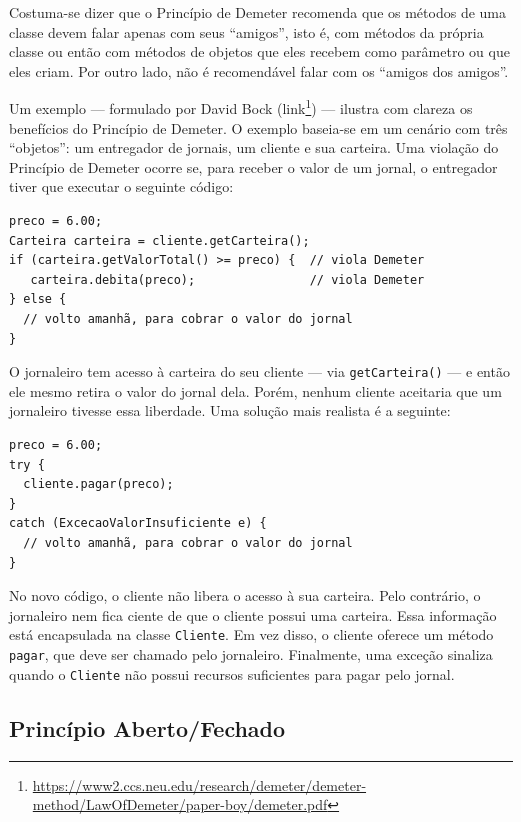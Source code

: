 \documentclass[
  11pt,
  twoside]{book}
\newcommand{\passthrough}[1]{#1}
\DeclareRobustCommand{\href}[2]{#2\footnote{\url{#1}}}
\begin{document}
Costuma-se dizer que o Princípio de Demeter recomenda que os métodos de
uma classe devem falar apenas com seus ``amigos'', isto é, com métodos
da própria classe ou então com métodos de objetos que eles recebem como
parâmetro ou que eles criam. Por outro lado, não é recomendável falar
com os ``amigos dos amigos''.

Um exemplo --- formulado por David Bock
(\href{https://www2.ccs.neu.edu/research/demeter/demeter-method/LawOfDemeter/paper-boy/demeter.pdf}{link})
--- ilustra com clareza os benefícios do Princípio de Demeter. O exemplo
baseia-se em um cenário com três ``objetos'': um entregador de jornais,
um cliente e sua carteira. Uma violação do Princípio de Demeter ocorre
se, para receber o valor de um jornal, o entregador tiver que executar o
seguinte código:

\begin{lstlisting}
preco = 6.00;
Carteira carteira = cliente.getCarteira();
if (carteira.getValorTotal() >= preco) {  // viola Demeter
   carteira.debita(preco);                // viola Demeter
} else {
  // volto amanhã, para cobrar o valor do jornal
}
\end{lstlisting}

O jornaleiro tem acesso à carteira do seu cliente --- via
\passthrough{\lstinline!getCarteira()!} --- e então ele mesmo retira o
valor do jornal dela. Porém, nenhum cliente aceitaria que um jornaleiro
tivesse essa liberdade. Uma solução mais realista é a seguinte:

\begin{lstlisting}
preco = 6.00;
try {
  cliente.pagar(preco);
}
catch (ExcecaoValorInsuficiente e) {
  // volto amanhã, para cobrar o valor do jornal
}
\end{lstlisting}

No novo código, o cliente não libera o acesso à sua carteira. Pelo
contrário, o jornaleiro nem fica ciente de que o cliente possui uma
carteira. Essa informação está encapsulada na classe
\passthrough{\lstinline!Cliente!}. Em vez disso, o cliente oferece um
método \passthrough{\lstinline!pagar!}, que deve ser chamado pelo
jornaleiro. Finalmente, uma exceção sinaliza quando o
\passthrough{\lstinline!Cliente!} não possui recursos suficientes para
pagar pelo jornal.

\hypertarget{princuxedpio-abertofechado}{%
\subsection{Princípio Aberto/Fechado}\label{princuxedpio-abertofechado}}
\end{document}
